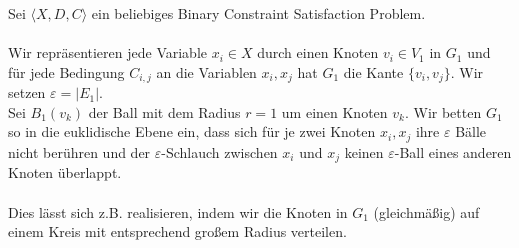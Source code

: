 \documentclass[a4paper, 12pt, twoside]{article}
\theoremstyle{Format1} %
\begin{document}
Sei $\langle X,D,C \rangle$ ein beliebiges Binary Constraint Satisfaction Problem.
\\
\\
Wir repräsentieren jede Variable $x_i \in X$ durch einen Knoten $v_i \in V_1$ in $G_1$ und für jede Bedingung $C_{i,j}$ an die Variablen $x_i, x_j$
hat $G_1$ die Kante $\{v_i, v_j\}$. Wir setzen $\varepsilon = |E_1|$.
\\
Sei $B_1(v_k)$ der Ball mit dem Radius $r=1$ um einen Knoten $v_k$.
Wir betten $G_1$ so in die euklidische Ebene ein, dass sich für je zwei Knoten $x_i,x_j$ ihre $\varepsilon$ Bälle nicht berühren und
der $\varepsilon$-Schlauch zwischen $x_i$ und $x_j$ keinen $\varepsilon$-Ball eines anderen Knoten überlappt.
\\
\\
Dies lässt sich z.B. realisieren, indem wir die Knoten in $G_1$ (gleichmäßig) auf einem Kreis mit entsprechend großem Radius verteilen.
\end{document}
